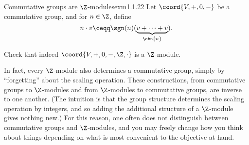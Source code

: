 \begin{exm}{Commutative groups are $\Z$-modules}{exm1.1.22}
	Let $\coord{V,+,0,-}$ be a commutative group, and for $n\in \Z$, define
	\begin{equation}
		n\cdot v\ceqq \sgn (n) (\underbrace{v+\cdots +v}_{\abs{n}}).
	\end{equation}
	\begin{exr}[breakable=false]{}{}
		Check that indeed $\coord{V,+,0,-,\Z ,\cdot}$ is a $\Z$-module.
	\end{exr}
	\begin{rmk}
		In fact, every $\Z$-module also determines a commutative group, simply by ``forgetting'' about the scaling operation.  These constructions, from commutative groups to $\Z$-modules and from $\Z$-modules to commutative groups, are inverse to one another.  (The intuition is that the group structure determines the scaling operation by integers, and so adding the additional structure of a $\Z$-module gives nothing new.)  For this reason, one often does not distinguish between commutative groups and $\Z$-modules, and you may freely change how you think about things depending on what is most convenient to the objective at hand.
	\end{rmk}
\end{exm}

